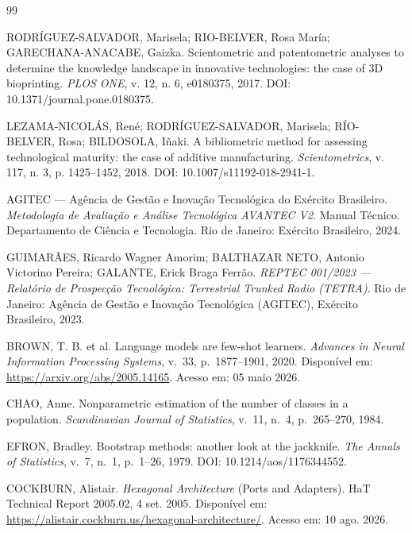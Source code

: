 \documentclass[12pt, a4paper]{article}
\begin{document}
\newpage
\renewcommand{\refname}{Referências}

\begin{thebibliography}{99}

RODRÍGUEZ-SALVADOR, Marisela; RIO-BELVER, Rosa María; GARECHANA-ANACABE, Gaizka.
Scientometric and patentometric analyses to determine the knowledge landscape
in innovative technologies: the case of 3D bioprinting.
\textit{PLOS ONE}, v. 12, n. 6, e0180375, 2017.
DOI: 10.1371/journal.pone.0180375.

LEZAMA-NICOLÁS, René; RODRÍGUEZ-SALVADOR, Marisela; RÍO-BELVER, Rosa; BILDOSOLA, Iñaki.
A bibliometric method for assessing technological maturity: the case of
additive manufacturing.
\textit{Scientometrics}, v. 117, n. 3, p. 1425--1452, 2018.
DOI: 10.1007/s11192-018-2941-1.

AGITEC --- Agência de Gestão e Inovação Tecnológica do Exército Brasileiro.
\textit{Metodologia de Avaliação e Análise Tecnológica AVANTEC V2}.
Manual Técnico. Departamento de Ciência e Tecnologia.
Rio de Janeiro: Exército Brasileiro, 2024.

GUIMARÃES, Ricardo Wagner Amorim; BALTHAZAR NETO, Antonio Victorino Pereira;
GALANTE, Erick Braga Ferrão.
\textit{REPTEC 001/2023 --- Relatório de Prospecção Tecnológica: Terrestrial
Trunked Radio (TETRA)}.
Rio de Janeiro: Agência de Gestão e Inovação Tecnológica (AGITEC), Exército
Brasileiro, 2023.

BROWN, T. B. et al.
Language models are few-shot learners.
\textit{Advances in Neural Information Processing Systems}, v.~33,
p.~1877--1901, 2020.
Disponível em: \url{https://arxiv.org/abs/2005.14165}.
Acesso em: 05 maio 2026.

CHAO, Anne.
Nonparametric estimation of the number of classes in a population.
\textit{Scandinavian Journal of Statistics}, v.~11, n.~4, p.~265--270, 1984.

EFRON, Bradley.
Bootstrap methods: another look at the jackknife.
\textit{The Annals of Statistics}, v.~7, n.~1, p.~1--26, 1979.
DOI: 10.1214/aos/1176344552.

COCKBURN, Alistair.
\textit{Hexagonal Architecture} (Ports and Adapters).
HaT Technical Report 2005.02, 4 set. 2005.
Disponível em: \url{https://alistair.cockburn.us/hexagonal-architecture/}.
Acesso em: 10 ago. 2026.


\end{thebibliography}
\end{document}
